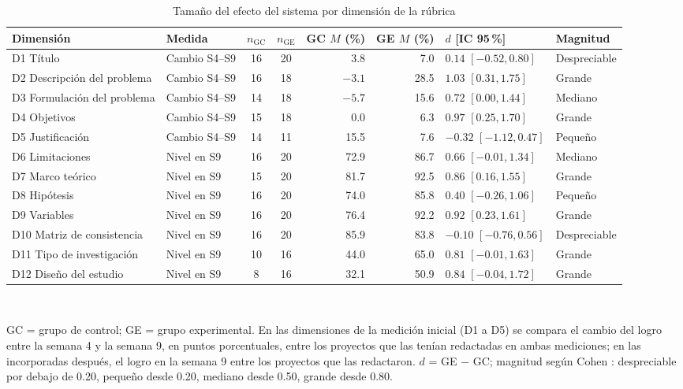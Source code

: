 \documentclass[journal]{IEEEtran}
\begin{document}
\begin{table}[!t]
\caption{Tamaño del efecto del sistema por dimensión de la rúbrica}
\label{tab:effect}
\centering
\footnotesize
\begin{tabular}{L{3.4cm}L{2.4cm}ccrrL{2.6cm}L{1.8cm}}
\toprule
Dimensión & Medida & $n_{\mathrm{GC}}$ & $n_{\mathrm{GE}}$ & GC $M$ (\%) & GE $M$ (\%) & $d$ [IC 95\,\%] & Magnitud \\
\midrule
D1 Título & Cambio S4--S9 & 16 & 20 & 3.8 & 7.0 & $0.14$ $[-0.52, 0.80]$ & Despreciable \\
D2 Descripción del problema & Cambio S4--S9 & 16 & 18 & $-3.1$ & 28.5 & $1.03$ $[0.31, 1.75]$ & Grande \\
D3 Formulación del problema & Cambio S4--S9 & 14 & 18 & $-5.7$ & 15.6 & $0.72$ $[0.00, 1.44]$ & Mediano \\
D4 Objetivos & Cambio S4--S9 & 15 & 18 & 0.0 & 6.3 & $0.97$ $[0.25, 1.70]$ & Grande \\
D5 Justificación & Cambio S4--S9 & 14 & 11 & 15.5 & 7.6 & $-0.32$ $[-1.12, 0.47]$ & Pequeño \\
D6 Limitaciones & Nivel en S9 & 16 & 20 & 72.9 & 86.7 & $0.66$ $[-0.01, 1.34]$ & Mediano \\
D7 Marco teórico & Nivel en S9 & 15 & 20 & 81.7 & 92.5 & $0.86$ $[0.16, 1.55]$ & Grande \\
D8 Hipótesis & Nivel en S9 & 16 & 20 & 74.0 & 85.8 & $0.40$ $[-0.26, 1.06]$ & Pequeño \\
D9 Variables & Nivel en S9 & 16 & 20 & 76.4 & 92.2 & $0.92$ $[0.23, 1.61]$ & Grande \\
D10 Matriz de consistencia & Nivel en S9 & 16 & 20 & 85.9 & 83.8 & $-0.10$ $[-0.76, 0.56]$ & Despreciable \\
D11 Tipo de investigación & Nivel en S9 & 10 & 16 & 44.0 & 65.0 & $0.81$ $[-0.01, 1.63]$ & Grande \\
D12 Diseño del estudio & Nivel en S9 & 8 & 16 & 32.1 & 50.9 & $0.84$ $[-0.04, 1.72]$ & Grande \\
\bottomrule
\end{tabular}
\\[2pt]
\parbox{0.92\textwidth}{\raggedright\scriptsize GC = grupo de control; GE = grupo experimental. En las dimensiones de la medición inicial (D1 a D5) se compara el cambio del logro entre la semana 4 y la semana 9, en puntos porcentuales, entre los proyectos que las tenían redactadas en ambas mediciones; en las incorporadas después, el logro en la semana 9 entre los proyectos que las redactaron. $d$ = GE $-$ GC; magnitud según Cohen \cite{cohen1988}: despreciable por debajo de 0.20, pequeño desde 0.20, mediano desde 0.50, grande desde 0.80.}
\end{table}
\end{document}
